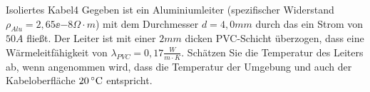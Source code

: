 \begin{problem}{Isoliertes Kabel}{4}
Gegeben ist ein Aluminiumleiter (spezifischer Widerstand  $\rho_{Alu}=2,65\ee{-8}\unit{\Omega\cdot m}$) mit dem Durchmesser $d=4,0\unit{mm}$ durch das ein Strom von $50\unit{A}$ fließt. Der Leiter ist mit einer $2\unit{mm}$ dicken PVC-Schicht überzogen, dass eine Wärmeleitfähigkeit von $\lambda_{PVC}=0,17\unit{\frac{W}{m\cdot K}}$. Schätzen Sie die Temperatur des Leiters ab, wenn angenommen wird, dass die Temperatur der Umgebung und auch der Kabeloberfläche $20\,^\circ\mathrm{C}$ entspricht.
\end{problem}


 
